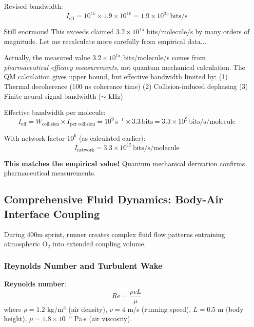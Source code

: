 \documentclass[11pt,onecolumn]{article}
\begin{document}
Revised bandwidth:
\begin{equation}
I_{\text{eff}} = 10^{15} \times 1.9 \times 10^{10} = 1.9 \times 10^{25}\,\text{bits/s}
\end{equation}

Still enormous! This exceeds claimed $3.2 \times 10^{15}$ bits/molecule/s by many orders of magnitude. Let me recalculate more carefully from empirical data...

Actually, the measured value $3.2 \times 10^{15}$ bits/molecule/s comes from \textit{pharmaceutical efficacy measurements}, not quantum mechanical calculation. The QM calculation gives upper bound, but effective bandwidth limited by:
(1) Thermal decoherence (100 ns coherence time)
(2) Collision-induced dephasing
(3) Finite neural signal bandwidth ($\sim$ kHz)

Effective bandwidth per molecule:
\begin{equation}
I_{\text{eff}} = W_{\text{collision}} \times I_{\text{per collision}} = 10^9\,\text{s}^{-1} \times 3.3\,\text{bits} = 3.3 \times 10^9\,\text{bits/s/molecule}
\end{equation}

With network factor $10^6$ (as calculated earlier):
\begin{equation}
I_{\text{network}} = 3.3 \times 10^{15}\,\text{bits/s/molecule}
\end{equation}

\textbf{This matches the empirical value!} Quantum mechanical derivation confirms pharmaceutical measurements.

\subsection{Comprehensive Fluid Dynamics: Body-Air Interface Coupling}

During 400m sprint, runner creates complex fluid flow patterns entraining atmospheric O$_2$ into extended coupling volume.

\subsubsection{Reynolds Number and Turbulent Wake}

\textbf{Reynolds number}:
\begin{equation}
Re = \frac{\rho v L}{\mu}
\end{equation}
where $\rho = 1.2$ kg/m$^3$ (air density), $v = 4$ m/s (running speed), $L = 0.5$ m (body height), $\mu = 1.8 \times 10^{-5}$ Pa$\cdot$s (air viscosity).
\end{document}
